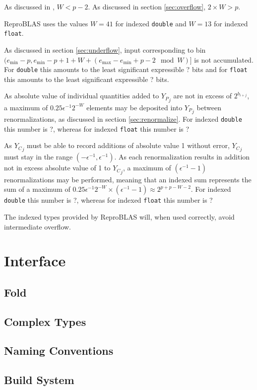 \documentclass[12pt]{article}
\providecommand{\min}{\ensuremath{\text{min}}}
\providecommand{\max}{\ensuremath{\text{max}}}
\theoremstyle{plain}
\begin{document}
    As discussed in \cite{repsum}, $W < p - 2$. As discussed in section \ref{sec:overflow}, $2\times W > p$.

    ReproBLAS uses the values $W = 41$ for indexed \verb|double| and $W = 13$ for indexed \verb|float|.

    As discussed in section \ref{sec:underflow}, input corresponding to bin $(e_{\min} - p, e_{\min} - p + 1 + W + (e_{\max} - e_{\min} + p - 2 \mod W)]$ is not accumulated. For \verb|double| this amounts to the least significant expressible ? bits and for \verb|float| this amounts to the least significant expressible ? bits.

    As absolute value of individual quantities added to ${Y_P}_j$ are not in excess of $2^{b_{i + j}}$, a maximum of $0.25\epsilon^{-1}2^{-W}$ elements may be deposited into ${Y_P}_j$ between renormalizations, as discussed in section \ref{sec:renormalize}. For indexed \verb|double| this number is ?, whereas for indexed \verb|float| this number is ?

    As ${Y_C}_j$ must be able to record additions of absolute value 1 without error, ${Y_C}_j$ must stay in the range $(-\epsilon^{-1}, \epsilon^{-1})$. As each renormalization results in addition not in excess absolute value of 1 to ${Y_C}_j$, a maximum of $(\epsilon^{-1} - 1)$ renormalizations may be performed, meaning that an indexed sum represents the sum of a maximum of $0.25\epsilon^{-1}2^{-W} \times (\epsilon^{-1} - 1) \approx 2^{p + p - W - 2}$. For indexed \verb|double| this number is ?, whereas for indexed \verb|float| this number is ?

    The indexed types provided by ReproBLAS will, when used correctly, avoid intermediate overflow.

\section{Interface}
  \subsection{Fold}
  \subsection{Complex Types}
  \subsection{Naming Conventions}
  \subsection{Build System}
\end{document}
